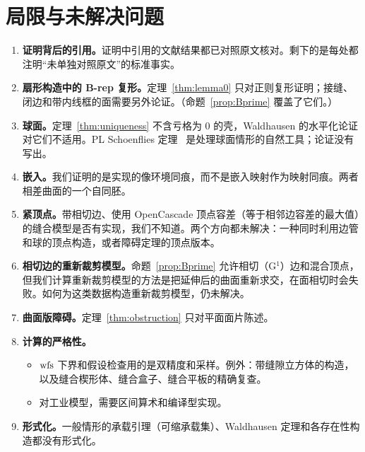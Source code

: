 \section{局限与未解决问题}\label{sec:open}

\begin{enumerate}
\item \textbf{证明背后的引用。}证明中引用的文献结果都已对照原文核对。剩下的是每处都注明``未单独对照原文''的标准事实。
\item \textbf{扇形构造中的 B-rep 复形。}定理~\ref{thm:lemma0} 只对正则复形证明；接缝、闭边和带内线框的面需要另外论证。（命题~\ref{prop:Bprime} 覆盖了它们。）
\item \textbf{球面。}定理~\ref{thm:uniqueness} 不含亏格为 0 的壳，Waldhausen 的水平化论证对它们不适用。PL Schoenflies 定理~\cite[Thm.~17.12]{Moise77} 是处理球面情形的自然工具；论证没有写出。
\item \textbf{嵌入。}我们证明的是实现的像环境同痕，而不是嵌入映射作为映射同痕。两者相差曲面的一个自同胚。
\item \textbf{紧顶点。}带相切边、使用 OpenCascade 顶点容差（等于相邻边容差的最大值）的缝合模型是否有实现，我们不知道。两个方向都未解决：一种同时利用边管和球的顶点构造，或者障碍定理的顶点版本。
\item \textbf{相切边的重新裁剪模型。}命题~\ref{prop:Bprime} 允许相切（G$^1$）边和混合顶点，但我们计算重新裁剪模型的方法是把延伸后的曲面重新求交，在面相切时会失败。如何为这类数据构造重新裁剪模型，仍未解决。
\item \textbf{曲面版障碍。}定理~\ref{thm:obstruction} 只对平面面片陈述。
\item \textbf{计算的严格性。}
  \begin{itemize}
  \item $\operatorname{wfs}$ 下界和假设检查用的是双精度和采样。例外：带缝隙立方体的构造，以及缝合楔形体、缝合盒子、缝合平板的精确复查。
  \item 对工业模型，需要区间算术和编译型实现。
  \end{itemize}
\item \textbf{形式化。}一般情形的承载引理（可缩承载集）、Waldhausen 定理和各存在性构造都没有形式化。
\end{enumerate}

